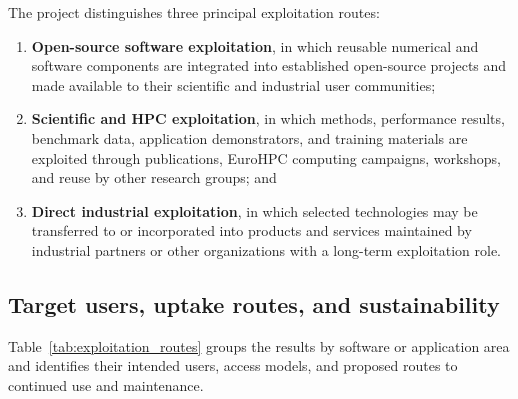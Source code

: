 \documentclass[a4paper,12pt]{article}
\begin{document}
The project distinguishes three principal exploitation routes:
\begin{enumerate}
  \item \textbf{Open-source software exploitation}, in which reusable
  numerical and software components are integrated into established
  open-source projects and made available to their scientific and industrial
  user communities;
  \item \textbf{Scientific and HPC exploitation}, in which methods,
  performance results, benchmark data, application demonstrators, and
  training materials are exploited through publications, EuroHPC computing
  campaigns, workshops, and reuse by other research groups; and
  \item \textbf{Direct industrial exploitation}, in which selected
  technologies may be transferred to or incorporated into products and
  services maintained by industrial partners or other organizations with a
  long-term exploitation role.
\end{enumerate}

\subsection{Target users, uptake routes, and sustainability}

Table~\ref{tab:exploitation_routes} groups the results by software or
application area and identifies their intended users, access models, and
proposed routes to continued use and maintenance.
\end{document}
